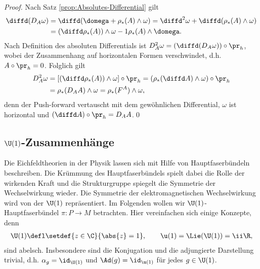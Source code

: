 \documentclass[%
	paper=a5,%
	fleqn,%
	DIV=18,%
	BCOR=0mm,
	fontsize=11pt,
	titlepage=false,%
	bibliography=totoc,
	DIV=18,%
	twoside=true,
	pdftitle=Riemannsche Geometrie,
	pdfauthor=Uwe Semmelmann,
	numbers=noendperiod]%
	{scrbook}
\begin{document}
\begin{proof}
Nach Satz \ref{prop:Absolutes-Differential} gilt
\begin{align*}
\diffd (D_A \omega) &=
\diffd(\domega + \rho_*(A)\wedge \omega)
= \diffd^2\omega + \diffd(\rho_*(A)\wedge \omega)\\
&= (\diffd\rho_*(A))\wedge \omega -1 \rho_*(A)\wedge \domega. 
\end{align*}
Nach Definition des absoluten Differentials ist $D_A^2 \omega = (\diffd(
D_A\omega))\circ\pr_h$, wobei der Zusammenhang  auf horizontalen
Formen verschwindet, d.h. $A\circ\pr_h = 0$. Folglich gilt
\begin{align*}
D_A^2\omega &= [(\diffd\rho_*(A))\wedge \omega]\circ\pr_h
= (\rho_*(\diffd A)\wedge \omega)\circ\pr_h\\
&= \rho_*(D_A A)\wedge \omega
= \rho_*(F^A)\wedge \omega,
\end{align*}
denn der Push-forward vertauscht mit dem gewöhnlichen Differential, $\omega$ ist
horizontal und $(\diffd A)\circ\pr_h = D_A A$.\qed
\end{proof}




\subsection{$\U(1)$-Zusammenhänge}

Die Eichfeldtheorien in der Physik lassen sich mit Hilfe von Hauptfaserbündeln
beschreiben. Die Krümmung des Hauptfaserbündels spielt dabei die Rolle der
wirkenden Kraft und die Strukturgruppe spiegelt die Symmetrie der Wechselwirkung
wieder. Die Symmetrie der elektromagnetischen Wechselwirkung wird von der
$\U(1)$ repräsentiert. Im Folgenden wollen wir $\U(1)$-Hauptfaserbündel
$\pi: P\to M$ betrachten. Hier vereinfachen sich einige Konzepte, denn
\begin{align*}
\U(1) \defl \setdef{z\in\C}{\abs{z}=1},\qquad \u(1) = \Lie(\U(1))= 
\ii\R,
\end{align*}
sind abelsch. Insbesondere sind die Konjugation und die adjungierte Darstellung trivial,
d.h. $\alpha_g = \id_{\U(1)}$ und $\Ad(g) = \id_{\u(1)}$ für jedes $g\in \U(1)$.
\end{document}
